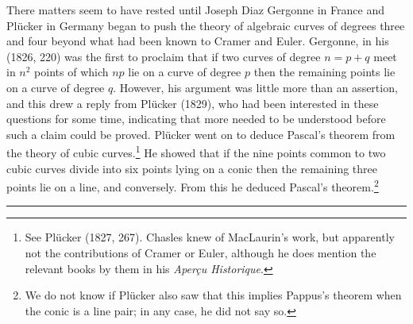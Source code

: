
There matters seem to have rested until Joseph Diaz Gergonne in France and Pl\"ucker in Germany began to push the theory of algebraic curves of degrees three and four beyond what had been known to Cramer and  Euler. Gergonne, in his (1826, 220) was the first to proclaim that if two curves of degree $n = p+q $ meet in $n^2$ points of which $np$ lie on a curve of degree $p$ then the remaining points lie on a curve of degree $q.$ However, his argument was little more than an assertion, and this drew a reply from Pl\"ucker (1829), who had been interested in these questions for some time, indicating that more needed to be understood before such a claim could be proved.  
Pl\"ucker went on  to deduce Pascal's theorem from the theory of cubic curves.\footnote{See Pl\"ucker (1827, 267). Chasles knew of MacLaurin's work, but apparently not the contributions of Cramer or  Euler, although he does mention the relevant books by them in his \emph{Aper\c{c}u Historique}.} He showed  that if the nine points common to two cubic curves divide into six points lying on a conic then the remaining three points lie on a line, and conversely. From this he deduced Pascal's theorem.\footnote{We do not know if Pl\"ucker also saw that this implies Pappus's theorem when the conic is a line pair; in any case,  he did not say so.}

\bigbreak\hrule\bigbreak


